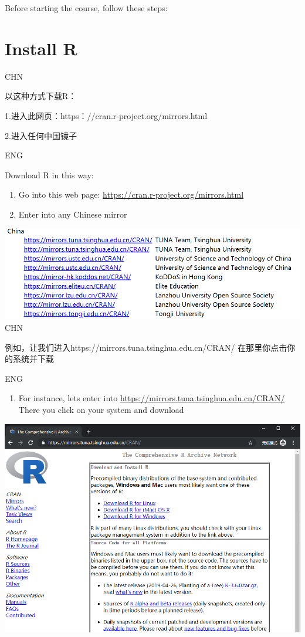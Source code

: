 \documentclass[]{book}
\providecommand{\tightlist}{%
  \setlength{\itemsep}{0pt}\setlength{\parskip}{0pt}}
\begin{document}
Before starting the course, follow these steps:

\hypertarget{install-r}{%
\section{Install R}\label{install-r}}

CHN

以这种方式下载R：

1.进入此网页：https：//cran.r-project.org/mirrors.html

2.进入任何中国镜子

ENG

Download R in this way:

\begin{enumerate}
\def\labelenumi{\arabic{enumi}.}
\tightlist
\item
  Go into this web page: \url{https://cran.r-project.org/mirrors.html}
\item
  Enter into any Chinese mirror
\end{enumerate}

\includegraphics{fig/01.png}
CHN

例如，让我们进入https://mirrors.tuna.tsinghua.edu.cn/CRAN/
在那里你点击你的系统并下载

ENG

\begin{enumerate}
\def\labelenumi{\arabic{enumi}.}
\setcounter{enumi}{2}
\tightlist
\item
  For instance, lets enter into \url{https://mirrors.tuna.tsinghua.edu.cn/CRAN/}
  There you click on your system and download
\end{enumerate}

\includegraphics{fig/02.png}
\end{document}
